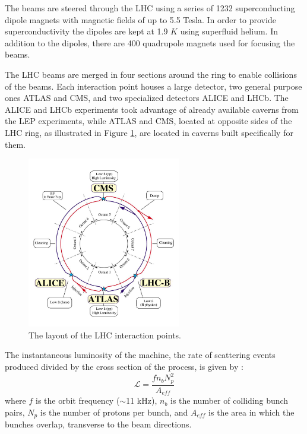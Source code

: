 The beams are steered through the LHC 
using a series of 1232 superconducting dipole magnets with magnetic fields 
of up to 5.5 Tesla. In order to provide superconductivity the 
dipoles are kept at 1.9 $K$ using superfluid helium.
In addition to the dipoles, there are 400 quadrupole magnets used
for focusing the beams.

The LHC beams are
merged in four sections around the ring to enable collisions of the beams. Each interaction point
houses a large detector, two general purpose ones ATLAS and CMS, and two specialized detectors
ALICE and LHCb. The ALICE and LHCb experiments took advantage of already available caverns from
the LEP experiments, while ATLAS and CMS, located at opposite sides of the LHC ring, as illustrated
in Figure \ref{fig:lhc}, are located in caverns built specifically for them.

\begin{figure}[htbp]
\centering
\includegraphics[width=0.6\textwidth]{plots/intro/lhc.jpg}
\caption{The layout of the LHC interaction points.\label{fig:lhc}}
\end{figure}

The instantaneous luminosity of the machine, \ie the rate of scattering events produced divided
by the cross section of the process, is given by \cite{Aaij:2011er}:
\begin{equation}
\mathcal{L}=\frac{f n_b N_p^2}{A_{eff}}
\end{equation}
where $f$ is the orbit frequency ($\sim$11 kHz), $n_b$ is the number of colliding bunch pairs, 
$N_p$ is the number of protons per bunch, and $A_{eff}$ is the area in which the bunches
overlap, transverse to the beam directions.


